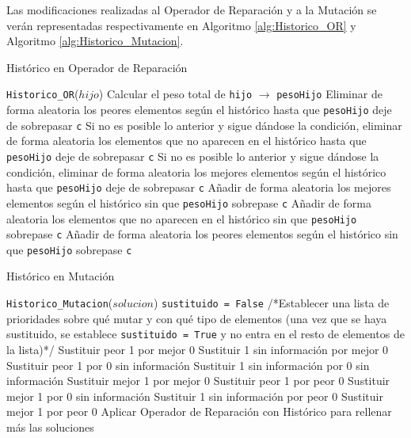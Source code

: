 Las modificaciones realizadas al Operador de Reparación y a la Mutación se verán representadas respectivamente en Algoritmo \ref{alg:Historico_OR} y Algoritmo \ref{alg:Historico_Mutacion}.

\begin{algorithm}
\caption{Histórico en Operador de Reparación}\label{alg:Historico_OR}
\begin{algorithmic}[1]
\Procedure \texttt{Historico\_OR}($hijo$)
\State Calcular el peso total de \texttt{hijo} $\xrightarrow{}{}$ \texttt{pesoHijo}
	\State Eliminar de forma aleatoria los peores elementos según el histórico hasta que \texttt{pesoHijo} deje de sobrepasar \texttt{c}
	\State Si no es posible lo anterior y sigue dándose la condición, eliminar de forma aleatoria los elementos que no aparecen en el histórico hasta que \texttt{pesoHijo} deje de sobrepasar \texttt{c}
	\State Si no es posible lo anterior y sigue dándose la condición, eliminar de forma aleatoria los mejores elementos según el histórico hasta que \texttt{pesoHijo} deje de sobrepasar \texttt{c}
\Else
	\State Añadir de forma aleatoria los mejores elementos según el histórico sin que \texttt{pesoHijo} sobrepase \texttt{c}
	\State Añadir de forma aleatoria los elementos que no aparecen en el histórico sin que \texttt{pesoHijo} sobrepase \texttt{c}
	\State Añadir de forma aleatoria los peores	elementos según el histórico sin que \texttt{pesoHijo} sobrepase \texttt{c}
\EndIf
\EndProcedure
\end{algorithmic}
\end{algorithm}

\begin{algorithm}
\caption{Histórico en Mutación}\label{alg:Historico_Mutacion}
\begin{algorithmic}[1]
\Procedure \texttt{Historico\_Mutacion}($solucion$)
\State \texttt{sustituido = False}
  /*Establecer una lista de prioridades sobre qué mutar y con qué tipo de elementos (una vez que se haya sustituido, se establece \texttt{sustituido = True} y no entra en el resto de elementos de la lista)*/
	\State Sustituir peor 1 por mejor 0
	\State Sustituir 1 sin información por mejor 0
	\State Sustituir peor 1 por 0 sin información
	\State Sustituir 1 sin información por 0 sin información
	\State Sustituir mejor 1 por mejor 0
	\State Sustituir peor 1 por peor 0
	\State Sustituir mejor 1 por 0 sin información 
	\State Sustituir 1 sin información por peor 0
	\State Sustituir mejor 1 por peor 0
\EndIf
\State Aplicar Operador de Reparación con Histórico para rellenar más las soluciones
\EndProcedure
\end{algorithmic}
\end{algorithm}

